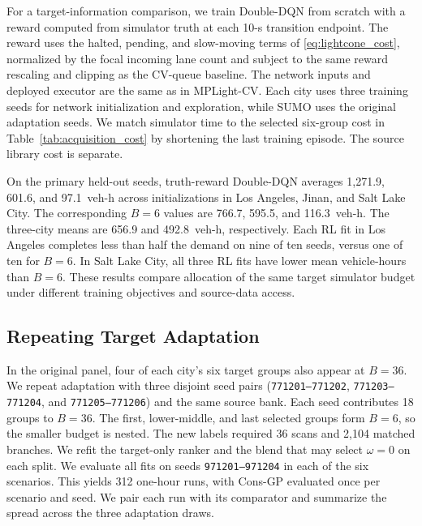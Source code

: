 \documentclass[letterpaper,journal]{IEEEtran}
\begin{document}
For a target-information comparison, we train Double-DQN from scratch with a reward computed from simulator truth at each 10-s transition endpoint. The reward uses the halted, pending, and slow-moving terms of \eqref{eq:lightcone_cost}, normalized by the focal incoming lane count and subject to the same reward rescaling and clipping as the CV-queue baseline. The network inputs and deployed executor are the same as in MPLight-CV. Each city uses three training seeds for network initialization and exploration, while SUMO uses the original adaptation seeds. We match simulator time to the selected six-group cost in Table~\ref{tab:acquisition_cost} by shortening the last training episode. The source library cost is separate.

On the primary held-out seeds, truth-reward Double-DQN averages 1,271.9, 601.6, and 97.1~veh-h across initializations in Los Angeles, Jinan, and Salt Lake City. The corresponding $B=6$ values are 766.7, 595.5, and 116.3~veh-h. The three-city means are 656.9 and 492.8~veh-h, respectively. Each RL fit in Los Angeles completes less than half the demand on nine of ten seeds, versus one of ten for $B=6$. In Salt Lake City, all three RL fits have lower mean vehicle-hours than $B=6$. These results compare allocation of the same target simulator budget under different training objectives and source-data access.

\subsection{Repeating Target Adaptation}
In the original panel, four of each city's six target groups also appear at $B=36$. We repeat adaptation with three disjoint seed pairs (\texttt{771201--771202}, \texttt{771203--771204}, and \texttt{771205--771206}) and the same source bank. Each seed contributes 18 groups to $B=36$. The first, lower-middle, and last selected groups form $B=6$, so the smaller budget is nested. The new labels required 36 scans and 2,104 matched branches. We refit the target-only ranker and the blend that may select $\omega=0$ on each split. We evaluate all fits on seeds \texttt{971201--971204} in each of the six scenarios. This yields 312 one-hour runs, with Cons-GP evaluated once per scenario and seed. We pair each run with its comparator and summarize the spread across the three adaptation draws.
\end{document}
